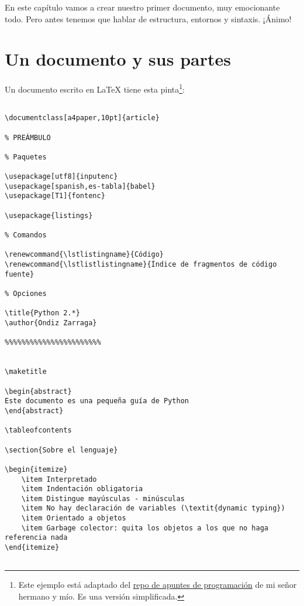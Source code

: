 En este capítulo vamos a crear nuestro primer documento, muy
emocionante todo. Pero antes tenemos que hablar de estructura,
entornos y sintaxis. ¡Ánimo!

\section{Un documento y sus partes}\label{un-documento-y-sus-partes}

Un documento escrito en LaTeX tiene esta pinta\footnote{Este ejemplo
  está adaptado del
  \href{https://github.com/ekaitz-zarraga/programming-notes}{repo de
  apuntes de programación} de mi señor hermano y mío. Es una versión
  simplificada.}:

\begin{lstlisting}[language={[latex]tex}, caption={Ejemplo de documento escrito con \LaTeX}]

\documentclass[a4paper,10pt]{article}

% PREÁMBULO

% Paquetes

\usepackage[utf8]{inputenc}
\usepackage[spanish,es-tabla]{babel}
\usepackage[T1]{fontenc}

\usepackage{listings}

% Comandos

\renewcommand{\lstlistingname}{Código}
\renewcommand{\lstlistlistingname}{Índice de fragmentos de código fuente}

% Opciones

\title{Python 2.*}
\author{Ondiz Zarraga}

%%%%%%%%%%%%%%%%%%%%%%%


\maketitle

\begin{abstract}
Este documento es una pequeña guía de Python
\end{abstract}

\tableofcontents

\section{Sobre el lenguaje}

\begin{itemize}
    \item Interpretado
    \item Indentación obligatoria
    \item Distingue mayúsculas - minúsculas
    \item No hay declaración de variables (\textit{dynamic typing})
    \item Orientado a objetos
    \item Garbage colector: quita los objetos a los que no haga referencia nada
\end{itemize}


\end{lstlisting}

